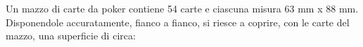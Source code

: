 Un mazzo di carte da poker contiene 54 carte 
e ciascuna misura 63 mm x 88 mm. 
Disponendole accuratamente, fianco a fianco, si riesce a coprire, 
con le carte del mazzo, una superficie di circa:
